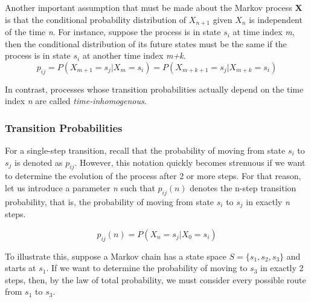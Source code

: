 \documentclass[a4paper, 12pt]{article}
\begin{document}
	Another important assumption that must be made about the Markov process \textbf{X} is that the conditional probability 				distribution of $X_{n+1}$ given $X_n$ is independent of the time \emph{n}. For instance, suppose the process is in state $s_i$ at time index \emph{m}, then the conditional distribution of its future states must be the same if the process is in state $s_i$ at another time index \emph{m+k}.
	\\
	\[
	p_{ij} = P(X_{m+1} = s_j | X_{m} = s_i) = P(X_{m+k+1} = s_j | X_{m+k} = s_i)
	\]

	In contrast, processes whose transition probabilities actually depend on the time index \emph{n} are called \emph{time-inhomogenous}.
	
	\subsubsection*{Transition Probabilities}
	
	For a single-step transition, recall that the probability of moving from state $s_i$ to $s_j$ is denoted as $p_{ij}$. However, this notation quickly becomes strenuous if we want to determine the evolution of the process after 2 or more steps. For that reason, let us introduce a parameter \emph{n} such that $p_{ij}(n)$ denotes the n-step transition probability, that is, the probability of moving from state $s_i$ to $s_j$ in exactly \emph{n} steps. 
		
	\[p_{ij}(n) = P(X_{n} = s_j | X_{0} = s_i)\]
	
	To illustrate this, suppose a Markov chain has a state space $S = \{s_1, s_2, s_3\}$ and starts at $s_1$. If we want to determine the probability of moving to $s_3$ in exactly 2 steps, then, by the law of total probability, we must consider every possible route from $s_1$ to $s_3$.
	
\end{document}
